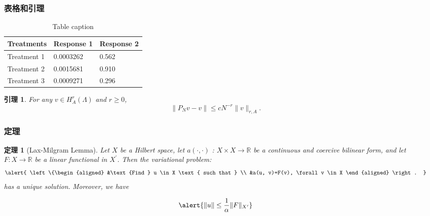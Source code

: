 \documentclass[11pt,compress]{beamer}
\newtheorem{thm}{定理}
\numberwithin{thm}{section}
\numberwithin{defn}{section}
\newtheorem{lmm}{引理}
\numberwithin{lmm}{section}
\theoremstyle{example}
\numberwithin{figure}{section}
\numberwithin{table}{section}
\numberwithin{equation}{section}
\begin{document}
\begin{frame}
\frametitle{表格和引理}
\begin{table}
\caption{Table caption}
\begin{tabular}{l l l}
\toprule
\textbf{Treatments} & \textbf{Response 1} & \textbf{Response 2}\\
\midrule
Treatment 1 & 0.0003262 & 0.562 \\
Treatment 2 & 0.0015681 & 0.910 \\
Treatment 3 & 0.0009271 & 0.296 \\
\bottomrule
\end{tabular}
\end{table}
\begin{lmm} \upshape
  For any $v \in H_{A}^{r}(\Lambda)$ and $r \geq 0$,
  \begin{equation}
    \|P_{N} v-v\| \leq c N^{-r}\|v\|_{r, A}.
  \end{equation}
\end{lmm}
\end{frame}



\begin{frame}
\frametitle{定理}

\begin{thm}[Lax-Milgram Lemma] \upshape
Let $X$ be a Hilbert space, let $a(\cdot, \cdot)$ : $X \times X \rightarrow \mathbb{R}$ be a continuous and coercive bilinear form, and let $F : X \rightarrow \mathbb{R}$ be a linear functional in $X^{\prime}$. Then the variational problem:
\begin{equation}
  \alert{
  \left\{\begin{aligned}
  &\text {Find } u \in X \text { such that } \\
  &a(u, v)=F(v), \forall v \in X
  \end{aligned} \right. }
\end{equation}
has a unique solution. Moreover, we have

\begin{equation}
  \alert{ \|u\| \leq \frac{1}{\alpha}\|F\|_{X^{\prime}}  }
\end{equation}
\end{thm}

\end{frame}

\end{document}
